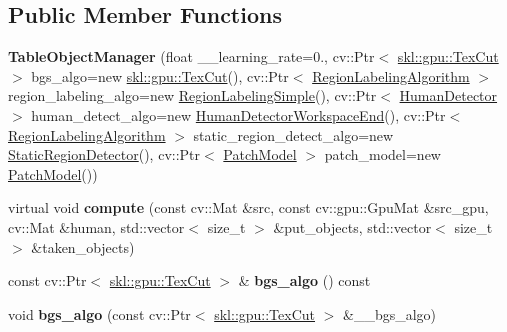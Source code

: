 \subsection*{Public Member Functions}
\begin{DoxyCompactItemize}
\item 
\hypertarget{classskl_1_1gpu_1_1_table_object_manager_a0ff30de4687ffad72163fc748fc551e5}{}\label{classskl_1_1gpu_1_1_table_object_manager_a0ff30de4687ffad72163fc748fc551e5} 
{\bfseries Table\+Object\+Manager} (float \+\_\+\+\_\+learning\+\_\+rate=0., cv\+::\+Ptr$<$ \hyperlink{classskl_1_1gpu_1_1_tex_cut}{skl\+::gpu\+::\+Tex\+Cut} $>$ bgs\+\_\+algo=new \hyperlink{classskl_1_1gpu_1_1_tex_cut}{skl\+::gpu\+::\+Tex\+Cut}(), cv\+::\+Ptr$<$ \hyperlink{classskl_1_1_filter_mat2_mat}{Region\+Labeling\+Algorithm} $>$ region\+\_\+labeling\+\_\+algo=new \hyperlink{classskl_1_1_region_labeling_simple}{Region\+Labeling\+Simple}(), cv\+::\+Ptr$<$ \hyperlink{classskl_1_1_filter_mat2_mat}{Human\+Detector} $>$ human\+\_\+detect\+\_\+algo=new \hyperlink{classskl_1_1_human_detector_workspace_end}{Human\+Detector\+Workspace\+End}(), cv\+::\+Ptr$<$ \hyperlink{classskl_1_1_filter_mat2_mat}{Region\+Labeling\+Algorithm} $>$ static\+\_\+region\+\_\+detect\+\_\+algo=new \hyperlink{classskl_1_1_static_region_detector}{Static\+Region\+Detector}(), cv\+::\+Ptr$<$ \hyperlink{classskl_1_1_patch_model}{Patch\+Model} $>$ patch\+\_\+model=new \hyperlink{classskl_1_1_patch_model}{Patch\+Model}())
\item 
\hypertarget{classskl_1_1gpu_1_1_table_object_manager_a6c57e723de495cf9be622b249a612958}{}\label{classskl_1_1gpu_1_1_table_object_manager_a6c57e723de495cf9be622b249a612958} 
virtual void {\bfseries compute} (const cv\+::\+Mat \&src, const cv\+::gpu\+::\+Gpu\+Mat \&src\+\_\+gpu, cv\+::\+Mat \&human, std\+::vector$<$ size\+\_\+t $>$ \&put\+\_\+objects, std\+::vector$<$ size\+\_\+t $>$ \&taken\+\_\+objects)
\item 
\hypertarget{classskl_1_1gpu_1_1_table_object_manager_a7b7dcddbfa9228f34ca7ebd57626bf8d}{}\label{classskl_1_1gpu_1_1_table_object_manager_a7b7dcddbfa9228f34ca7ebd57626bf8d} 
const cv\+::\+Ptr$<$ \hyperlink{classskl_1_1gpu_1_1_tex_cut}{skl\+::gpu\+::\+Tex\+Cut} $>$ \& {\bfseries bgs\+\_\+algo} () const
\item 
\hypertarget{classskl_1_1gpu_1_1_table_object_manager_a7ef64b9fffa6e95946c73431ba6207c4}{}\label{classskl_1_1gpu_1_1_table_object_manager_a7ef64b9fffa6e95946c73431ba6207c4} 
void {\bfseries bgs\+\_\+algo} (const cv\+::\+Ptr$<$ \hyperlink{classskl_1_1gpu_1_1_tex_cut}{skl\+::gpu\+::\+Tex\+Cut} $>$ \&\+\_\+\+\_\+bgs\+\_\+algo)
\end{DoxyCompactItemize}
